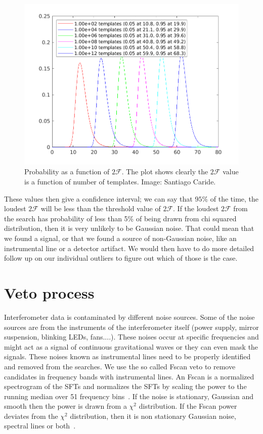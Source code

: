 \documentclass{ttuthes2007}
\begin{document}
\begin{figure}[bht!]                                                            
        \includegraphics[width=\textwidth]{figure/2F_max.png}                  
	\caption{Probability as a function of $2\mathcal{F}$. The plot shows
clearly the $2\mathcal{F}$ value is a function of number of  templates. Image:
Santiago Caride.}                             
        \label{fig:2F_max}                                                  
\end{figure} 
These values then give a confidence interval; we can say that $95\%$ of the
time, the loudest  $2\mathcal{F}$ will be less than the threshold value of
$2\mathcal{F}$. If the loudest  $2\mathcal{F}$ from the search has probability
of less than 5\% of being drawn from chi squared distribution, then it is very
unlikely to be Gaussian noise. That could mean that we found a signal, or that
we found a source of non-Gaussian noise, like an instrumental line or a detector
artifact. We would then have to do more detailed follow up on our individual
outliers to figure out which of those is the case.

\section{Veto process}
Interferometer data is contaminated by different noise sources. Some of the
noise sources are from the instruments of the interferometer itself (power supply, mirror
suspension, blinking LEDs, fans....). These noises occur at specific
frequencies and might act as a signal of continuous gravitational waves or they
can even mask the signals. These noises known as instrumental lines need to be
properly identified and removed from the searches. We use the so called Fscan
veto to remove candidates in frequency bands with instrumental lines. An Fscan
is a normalized spectrogram of the SFTs and normalizes the SFTs by scaling the
power to the running median over 51 frequency bins~\cite{Aasi_2015}. If the
noise is stationary, Gaussian and smooth then the power is drawn from a $\chi^2$
distribution. If the Fscan power deviates from the $\chi^2$ distribution, then
it is non stationary Gaussian noise, spectral lines or both~\cite{Aasi_2015}.
\end{document}
